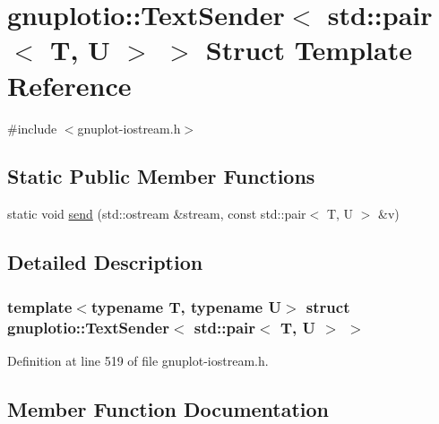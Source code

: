 \hypertarget{structgnuplotio_1_1_text_sender_3_01std_1_1pair_3_01_t_00_01_u_01_4_01_4}{}\section{gnuplotio\+:\+:Text\+Sender$<$ std\+:\+:pair$<$ T, U $>$ $>$ Struct Template Reference}
\label{structgnuplotio_1_1_text_sender_3_01std_1_1pair_3_01_t_00_01_u_01_4_01_4}


{\ttfamily \#include $<$gnuplot-\/iostream.\+h$>$}

\subsection*{Static Public Member Functions}
\begin{DoxyCompactItemize}
\item 
static void \hyperlink{structgnuplotio_1_1_text_sender_3_01std_1_1pair_3_01_t_00_01_u_01_4_01_4_ae1f3a6ffd8a60bb73d787578327154d1}{send} (std\+::ostream \&stream, const std\+::pair$<$ T, U $>$ \&v)
\end{DoxyCompactItemize}


\subsection{Detailed Description}
\subsubsection*{template$<$typename T, typename U$>$\newline
struct gnuplotio\+::\+Text\+Sender$<$ std\+::pair$<$ T, U $>$ $>$}



Definition at line 519 of file gnuplot-\/iostream.\+h.



\subsection{Member Function Documentation}
\mbox{\label{structgnuplotio_1_1_text_sender_3_01std_1_1pair_3_01_t_00_01_u_01_4_01_4_ae1f3a6ffd8a60bb73d787578327154d1}} 
